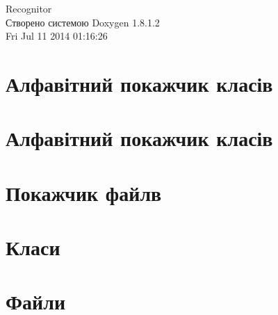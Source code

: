 \documentclass{book}
\begin{document}
\hypersetup{pageanchor=false,citecolor=blue}
\begin{titlepage}
\vspace*{7cm}
\begin{center}
{\Large Recognitor }\\
\vspace*{1cm}
{\large Створено системою Doxygen 1.8.1.2}\\
\vspace*{0.5cm}
{\small Fri Jul 11 2014 01:16:26}\\
\end{center}
\end{titlepage}
\clearemptydoublepage
{}
\tableofcontents
\clearemptydoublepage
{}
\hypersetup{pageanchor=true,citecolor=blue}
\chapter{Алфавітний покажчик класів}

\chapter{Алфавітний покажчик класів}

\chapter{Покажчик файлв}

\chapter{Класи}



















\chapter{Файли}



















\printindex
\end{document}
